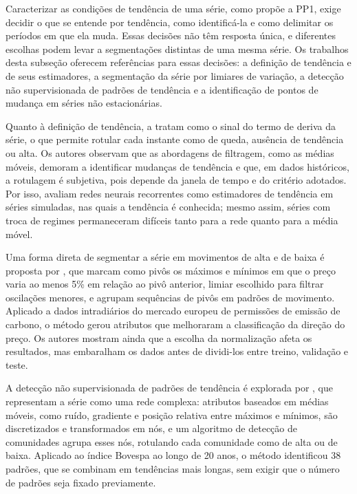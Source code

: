 \documentclass[12pt,a4paper]{article}
\begin{document}
Caracterizar as condições de tendência de uma série, como propõe a PP1, exige decidir o que se entende por tendência, como identificá-la e como delimitar os períodos em que ela muda. Essas decisões não têm resposta única, e diferentes escolhas podem levar a segmentações distintas de uma mesma série. Os trabalhos desta subseção oferecem referências para essas decisões: a definição de tendência e de seus estimadores, a segmentação da série por limiares de variação, a detecção não supervisionada de padrões de tendência e a identificação de pontos de mudança em séries não estacionárias.

Quanto à definição de tendência, \textcite{miot_empirical_2020} a tratam como o sinal do termo de deriva da série, o que permite rotular cada instante como de queda, ausência de tendência ou alta. Os autores observam que as abordagens de filtragem, como as médias móveis, demoram a identificar mudanças de tendência e que, em dados históricos, a rotulagem é subjetiva, pois depende da janela de tempo e do critério adotados. Por isso, avaliam redes neurais recorrentes como estimadores de tendência em séries simuladas, nas quais a tendência é conhecida; mesmo assim, séries com troca de regimes permaneceram difíceis tanto para a rede quanto para a média móvel.

Uma forma direta de segmentar a série em movimentos de alta e de baixa é proposta por \textcite{hosseini_pattern-based_2025}, que marcam como pivôs os máximos e mínimos em que o preço varia ao menos 5\% em relação ao pivô anterior, limiar escolhido para filtrar oscilações menores, e agrupam sequências de pivôs em padrões de movimento. Aplicado a dados intradiários do mercado europeu de permissões de emissão de carbono, o método gerou atributos que melhoraram a classificação da direção do preço. Os autores mostram ainda que a escolha da normalização afeta os resultados, mas embaralham os dados antes de dividi-los entre treino, validação e teste.

A detecção não supervisionada de padrões de tendência é explorada por \textcite{anghinoni_time_2019}, que representam a série como uma rede complexa: atributos baseados em médias móveis, como ruído, gradiente e posição relativa entre máximos e mínimos, são discretizados e transformados em nós, e um algoritmo de detecção de comunidades agrupa esses nós, rotulando cada comunidade como de alta ou de baixa. Aplicado ao índice Bovespa ao longo de 20 anos, o método identificou 38 padrões, que se combinam em tendências mais longas, sem exigir que o número de padrões seja fixado previamente.
\end{document}
